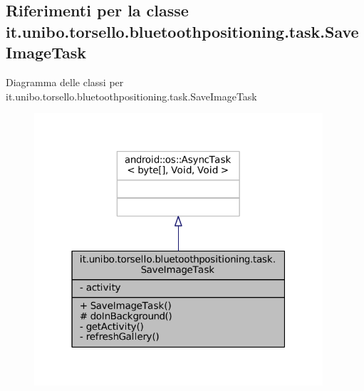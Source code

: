 \hypertarget{classit_1_1unibo_1_1torsello_1_1bluetoothpositioning_1_1task_1_1SaveImageTask}{}\subsection{Riferimenti per la classe it.\+unibo.\+torsello.\+bluetoothpositioning.\+task.\+Save\+Image\+Task}
\label{classit_1_1unibo_1_1torsello_1_1bluetoothpositioning_1_1task_1_1SaveImageTask}


Diagramma delle classi per it.\+unibo.\+torsello.\+bluetoothpositioning.\+task.\+Save\+Image\+Task
\nopagebreak
\begin{figure}[H]
\begin{center}
\leavevmode
\includegraphics[width=304pt]{classit_1_1unibo_1_1torsello_1_1bluetoothpositioning_1_1task_1_1SaveImageTask__inherit__graph}
\end{center}
\end{figure}


